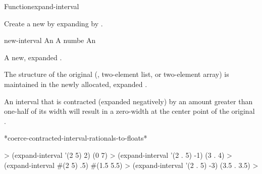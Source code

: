 \documentclass[10pt,twoside,english,pdftex]{article}
\begin{document}
\begin{functiondoc}{Function}{expand-interval}%
  {
    }
%
%

\fnsyntax

\fnpurpose Create a new  by expanding  by
.

\fnpackage {}

\fnmodule {}

\fnargs
\begin{args}{new-interval}
\arg[interval] An 
\arg[amount] A numbe
 An 
\end{args}

\fnreturns A new, expanded .

\fndescription The structure of the original 
(, two-element list, or two-element array) is maintained in the
newly allocated, expanded .

An interval that is contracted (expanded negatively) by an amount greater than
one-half of its width will result in a zero-width  at the
center point of the original .

\begin{alsos}{*coerce-contracted-interval-rationals-to-floats*}
\end{alsos}

\fnexamples
%
\W\supp
\begin{example}
  > (expand-interval '(2 5) 2)
  (0 7)
  > (expand-interval '(2 . 5) -1)
  (3 . 4)\goodpagebreak
  > (expand-interval #(2 5) .5)
  #(1.5 5.5)
  > (expand-interval '(2 . 5) -3)
  (3.5 . 3.5)
  >
\end{example}

\end{functiondoc}

\end{document}
